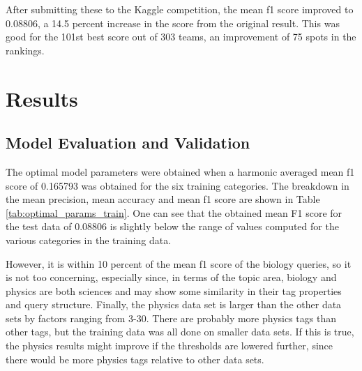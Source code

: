 \documentclass{article}
\begin{document}
After submitting these to the Kaggle competition, the mean f1 score improved
to 0.08806, a 14.5 percent increase in the score from the original
result. This was good for the 101st best score out of 303 teams, an
improvement of 75 spots in the rankings.  



\section{Results}

\subsection{Model Evaluation and Validation}

The optimal model parameters were obtained when a harmonic averaged mean f1
score of 0.165793 was obtained for the six training categories. The breakdown
in the mean precision, mean accuracy and mean f1 score are shown in Table
\ref{tab:optimal_params_train}. One can see that the obtained mean F1 score
for the test data of 0.08806 is slightly below the range of values computed for
the various categories in the training data.

However, it is within 10 percent of the mean f1 score of the biology queries,
so it is not too concerning, especially since, in terms of the topic area,
biology and physics are both sciences and may show some similarity in their
tag properties and query structure. Finally, the physics data set is larger
than the other data sets by factors ranging from 3-30. There are probably more
physics tags than other tags, but the training data was all done on smaller
data sets. If this is true, the physics results might improve if the
thresholds are lowered further, since there would be more physics tags
relative to other data sets.
\end{document}
